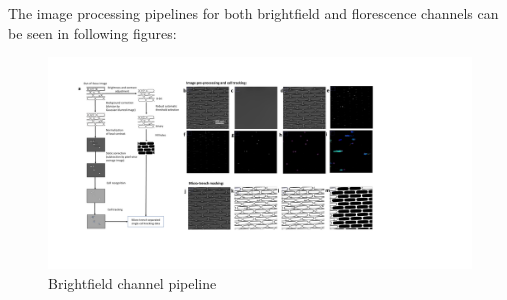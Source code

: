 \documentclass[pdftex,12pt,a4paper]{report}
\begin{document}
The image processing pipelines for both brightfield and florescence channels can be seen in following figures:


\begin{landscape}
\begin{figure}[H]
   \centering
    \includegraphics[height=0.95\textheight]{images/pipeline/01.pdf}
    \caption[Brightfield channel pipeline]{Brightfield channel pipeline}
\end{figure}
\label{fig:pipeline1}
\end{landscape}
\end{document}
